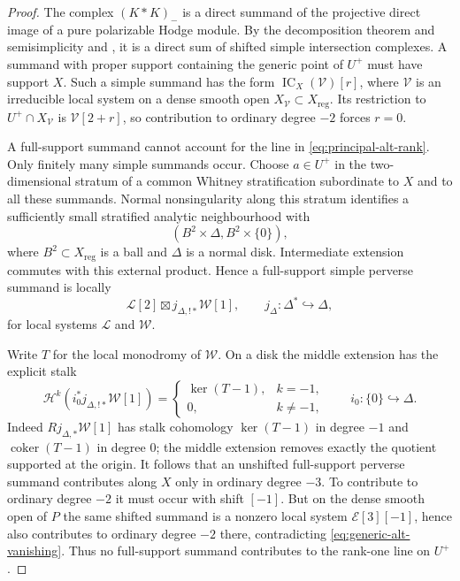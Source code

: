 \documentclass[10pt]{amsart}
\numberwithin{equation}{section}
\theoremstyle{definition}
\theoremstyle{remark}
\newcommand{\IC}{\operatorname{IC}}
\newcommand{\reg}{\mathrm{reg}}
\newcommand{\cH}{\mathcal H}
\begin{document}
\begin{proof}
The complex $(K*K)_-$ is a direct summand of the projective direct image of
a pure polarizable Hodge module.  By the decomposition theorem and
semisimplicity \cite[Th\'eor\`eme~6.2.5]{BBD1982} and
\cite[Th\'eor\`eme~5.3.1]{Saito1988}, it is a direct sum of shifted simple
intersection complexes.  A summand with proper support containing the
generic point of $U^+$ must have support $X$.  Such a simple summand has the
form $\IC_X(\mathcal V)[r]$, where $\mathcal V$ is an irreducible local
system on a dense smooth open $X_{\mathcal V}\subset X_{\reg}$.  Its
restriction to $U^+\cap X_{\mathcal V}$ is $\mathcal V[2+r]$, so contribution
to ordinary degree $-2$ forces $r=0$.

A full-support summand cannot account for the line in
\eqref{eq:principal-alt-rank}.  Only finitely many simple summands occur.
Choose $a\in U^+$ in the two-dimensional stratum of a common Whitney
stratification subordinate to $X$ and to all these summands.  Normal
nonsingularity along this stratum identifies a sufficiently small
stratified analytic neighbourhood with
\[
 (B^2\times\Delta,B^2\times\{0\}),
\]
where $B^2\subset X_{\reg}$ is a ball and $\Delta$ is a normal disk.
Intermediate extension commutes with this external product.  Hence a
full-support simple perverse summand is locally
\[
 \mathcal L[2]\boxtimes j_{\Delta,!*}\mathcal W[1],
 \qquad j_\Delta:\Delta^*\hookrightarrow\Delta,
\]
for local systems $\mathcal L$ and $\mathcal W$.

Write $T$ for the local monodromy of $\mathcal W$.  On a disk the middle
extension has the explicit stalk
\[
 \cH^k\!\left(i_0^*j_{\Delta,!*}\mathcal W[1]\right)
 =\begin{cases}
   \ker(T-1),&k=-1,\\
   0,&k\ne-1,
  \end{cases}
 \qquad i_0:\{0\}\hookrightarrow\Delta.
\]
Indeed $Rj_{\Delta,*}\mathcal W[1]$ has stalk cohomology
$\ker(T-1)$ in degree $-1$ and $\operatorname{coker}(T-1)$ in degree $0$;
the middle extension removes exactly the quotient supported at the origin.
It follows that an unshifted full-support perverse summand contributes along
$X$ only in ordinary degree $-3$.  To contribute to ordinary degree $-2$
it must occur with shift $[-1]$.  But on the dense smooth open of $P$ the
same shifted summand is a nonzero local system $\mathcal E[3][-1]$, hence
also contributes to ordinary degree $-2$ there, contradicting
\eqref{eq:generic-alt-vanishing}.  Thus no full-support summand contributes
to the rank-one line on $U^+$.


\end{proof}
\end{document}
